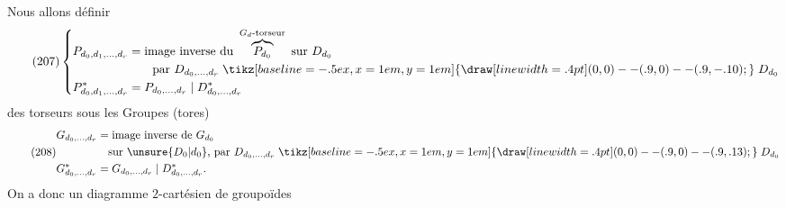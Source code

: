 Nous allons définir
\[
\tag{207}
\left\{\begin{aligned}
P_{d_0,d_1,\ldots,d_r}&=\text{image inverse du }\overbrace{P_{d_0}}^{G_d\text{-torseur}}\text{ sur }D_{d_0}\\
&\qquad\text{par }D_{d_0,\ldots,d_r}\mathrel{\tikz[baseline=-.5ex,x=1em,y=1em]{\draw[line width=.4pt] (0,0)--(.9,0)--(.9,-.10);}} D_{d_0}\\
P^*_{d_0,d_1,\ldots,d_r}&=P_{d_0,\ldots,d_r}\mid D^*_{d_0,\ldots,d_r}
\end{aligned}\right.
\]
 des torseurs sous les Groupes 
(tores)
\[
\tag{208}
\begin{aligned}
G_{d_0,\ldots,d_r}&=\text{image inverse de }G_{d_0}\\
&\quad\text{sur }\unsure{D_0|d_0}\text{, par }D_{d_0,\ldots,d_r}\mathrel{\tikz[baseline=-.5ex,x=1em,y=1em]{\draw[line width=.4pt] (0,0)--(.9,0)--(.9,.13);}} D_{d_0}\\
G^*_{d_0,\ldots,d_r}&=G_{d_0,\ldots,d_r}\mid D^*_{d_0,\ldots,d_r}.
\end{aligned}
\]
On a donc un diagramme $2$-cartésien de groupoïdes
